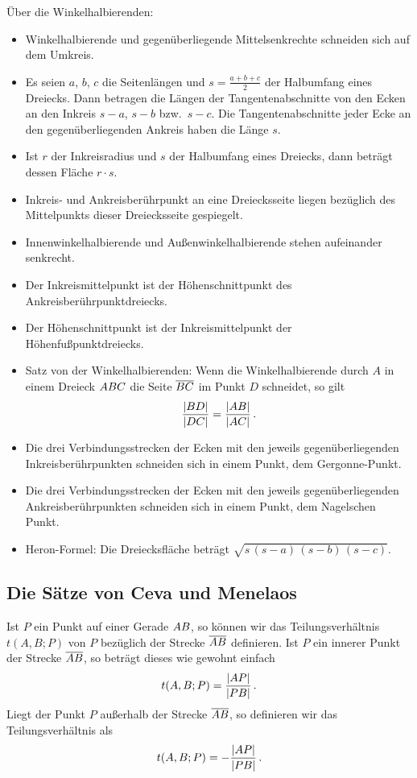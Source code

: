 \documentclass[11pt,a4paper]{article}
\begin{document}
Über die Winkelhalbierenden:
\begin{itemize}
\item Winkelhalbierende und gegenüberliegende Mittelsenkrechte schneiden sich
  auf dem Umkreis.
\item Es seien $a$, $b$, $c$ die Seitenlängen und $s=\frac{a+b+c}{2}$ der
  Halbumfang eines Dreiecks. Dann betragen die Längen der Tangentenabschnitte
  von den Ecken an den Inkreis $s-a$, $s-b$ bzw.\ $s-c$. Die
  Tangentenabschnitte jeder Ecke an den gegenüberliegenden Ankreis haben die
  Länge $s$.
\item Ist $r$ der Inkreisradius und $s$ der Halbumfang eines Dreiecks, dann
  beträgt dessen Fläche $r\cdot s$.
\item Inkreis- und Ankreisberührpunkt an eine Dreiecksseite liegen bezüglich
  des Mittelpunkts dieser Dreiecksseite gespiegelt.
\item Innenwinkelhalbierende und Außenwinkelhalbierende stehen aufeinander
  senkrecht.
\item Der Inkreismittelpunkt ist der Höhenschnittpunkt des
  Ankreisberührpunktdreiecks.
\item Der Höhenschnittpunkt ist der Inkreismittelpunkt der
  Höhenfußpunktdreiecks.
\item Satz von der Winkelhalbierenden: Wenn die Winkelhalbierende durch $A$ in
  einem Dreieck $\ktriangle*{ABC}$ die Seite $\overline{{\mathnormal{BC}}}$ im Punkt $D$
  schneidet, so gilt
  \begin{gather*}
    \frac{\left\vert {\mathnormal{BD}}\right\vert}{\left\vert {\mathnormal{DC}}\right\vert}=\frac{\left\vert {\mathnormal{AB}}\right\vert}{\left\vert {\mathnormal{AC}}\right\vert}\,.
  \end{gather*}
\item Die drei Verbindungsstrecken der Ecken mit den jeweils
  gegenüberliegenden Inkreisberührpunkten schneiden sich in einem Punkt, dem
  Gergonne-Punkt.
\item Die drei Verbindungsstrecken der Ecken mit den jeweils
  gegenüberliegenden Ankreisberührpunkten schneiden sich in einem Punkt, dem
  Nagelschen Punkt.
\item Heron-Formel: Die Dreiecksfläche beträgt
  $\sqrt{s\,(s-a)\,(s-b)\,(s-c)}$.
\end{itemize}

\subsection{Die Sätze von Ceva und Menelaos}

Ist $P$ ein Punkt auf einer Gerade ${\mathnormal{AB}}$, so können wir das
Teilungsverhältnis $t(A,B;P)$ von $P$ bezüglich der Strecke $\overline{{\mathnormal{AB}}}$
definieren. Ist $P$ ein innerer Punkt der Strecke $\overline{{\mathnormal{AB}}}$, so beträgt
dieses wie gewohnt einfach
\begin{gather*}
  t(A,B;P)=\frac{\left\vert {\mathnormal{AP}}\right\vert}{\left\vert {\mathnormal{PB}}\right\vert}\,.
\end{gather*}
Liegt der Punkt $P$ außerhalb der Strecke $\overline{{\mathnormal{AB}}}$, so definieren wir
das Teilungsverhältnis als 
\begin{gather*}
  t(A,B;P)=-\frac{\left\vert {\mathnormal{AP}}\right\vert}{\left\vert {\mathnormal{PB}}\right\vert}\,.
\end{gather*}
\end{document}
